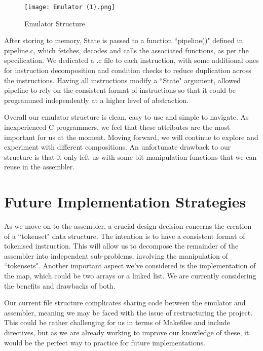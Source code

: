 \documentclass[]{article}
\begin{document}
\vspace{5mm}

\begin{wrapfigure}{L}{0.38\textwidth}
\centering
    \centering
    \texttt{[image: Emulator (1).png]}
    \caption{\label{fig1 :}Emulator Structure}
    
\end{wrapfigure}

After storing to memory, State is passed to a function ``pipeline()" defined in pipeline.c, which fetches, decodes and calls the associated functions, as per the specification. We dedicated a .c file to each instruction, with some additional ones for instruction decomposition and condition checks to reduce duplication across the instructions. Having all instructions modify a ``State" argument, allowed pipeline to rely on the consistent format of instructions so that it could be programmed independently at a higher level of abstraction.

\vspace{3mm}

Overall our emulator structure is clean, easy to use and simple to navigate. As inexperienced C programmers, we feel that these attributes are the most important for us at the moment. Moving forward, we will continue to explore and experiment with different compositions. An unfortunate drawback to our structure is that it only left us with some bit manipulation functions that we can reuse in the assembler.\newline\newline
\section*{Future Implementation Strategies}

As we move on to the assembler, a crucial design decision concerns the creation of a ``tokenset" data structure. The intention is to have a consistent format of tokenised instruction. This will allow us to decompose the remainder of the assembler into independent sub-problems, involving the manipulation of ``tokensets". Another important aspect we've considered is the implementation of the map, which could be two arrays or a linked list. We are currently considering the benefits and drawbacks of both.

\vspace{3mm}

Our current file structure complicates sharing code between the emulator and assembler, meaning we may be faced with the issue of restructuring the project. This could be rather challenging for us in terms of Makefiles and include directives, but as we are already working to improve our knowledge of these, it would be the perfect way to practice for future implementations. 
\end{document}

